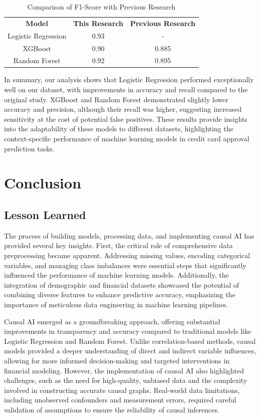 \documentclass[12pt]{report}
\begin{document}
    \begin{table}[h!]
        \centering
        \caption{Comparison of F1-Score with Previous Research}
        \begin{tabular}{|c|c|c|}
            \textbf{Model} & \textbf{This Research} & \textbf{Previous Research} \\
            Logistic Regression & 0.93 & - \\
            XGBoost & 0.90 & 0.885 \\
            Random Forest & 0.92 & 0.895 \\
        \end{tabular}
    \end{table}

    In summary, our analysis shows that Logistic Regression performed exceptionally well on our dataset, with improvements in accuracy and recall compared to the original study. XGBoost and Random Forest demonstrated slightly lower accuracy and precision, although their recall was higher, suggesting increased sensitivity at the cost of potential false positives. These results provide insights into the adaptability of these models to different datasets, highlighting the context-specific performance of machine learning models in credit card approval prediction tasks.

    \chapter{Conclusion}
    \section{Lesson Learned}
    The process of building models, processing data, and implementing causal AI has provided several key insights. First, the critical role of comprehensive data preprocessing became apparent. Addressing missing values, encoding categorical variables, and managing class imbalances were essential steps that significantly influenced the performance of machine learning models. Additionally, the integration of demographic and financial datasets showcased the potential of combining diverse features to enhance predictive accuracy, emphasizing the importance of meticulous data engineering in machine learning pipelines.
    
    Causal AI emerged as a groundbreaking approach, offering substantial improvements in transparency and accuracy compared to traditional models like Logistic Regression and Random Forest. Unlike correlation-based methods, causal models provided a deeper understanding of direct and indirect variable influences, allowing for more informed decision-making and targeted interventions in financial modeling. However, the implementation of causal AI also highlighted challenges, such as the need for high-quality, unbiased data and the complexity involved in constructing accurate causal graphs. Real-world data limitations, including unobserved confounders and measurement errors, required careful validation of assumptions to ensure the reliability of causal inferences.
\end{document}
